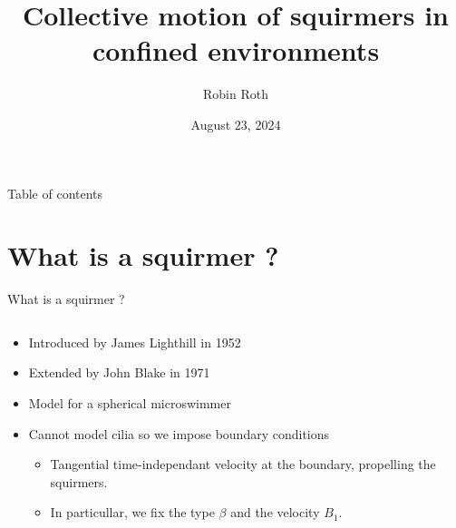 \documentclass{beamer}
\title{Collective motion of squirmers in conﬁned
environments}
\author{Robin Roth}
\institute{Supervised by: Van Landeghem Céline, Giraldi Laetitia, Agathe Chouippe}
\date{August 23, 2024}
\begin{document}
\begin{frame}
    \titlepage
\end{frame}

\begin{frame}{Table of contents}
    \tableofcontents
\end{frame}

\section{What is a squirmer ?}
\begin{frame}{What is a squirmer ?}
    \begin{columns}[T]
        \begin{column}{0.5\textwidth}
            \begin{itemize}
                \item Introduced by James Lighthill in 1952 \cite{Wikipedia}
                \item Extended by John Blake in 1971 \cite{Wikipedia}
                \item Model for a spherical microswimmer
                \item Cannot model cilia so we impose boundary conditions
                \begin{itemize}
                    \item Tangential time-independant velocity at the boundary, propelling the squirmers.
                    \item In particullar, we fix the type $\beta$ and the velocity $B_1$.
                \end{itemize}
            \end{itemize}
        \end{column}
        \begin{column}{0.5\textwidth}
            \centering

\end{column}
\end{columns}
\end{frame}
\end{document}

